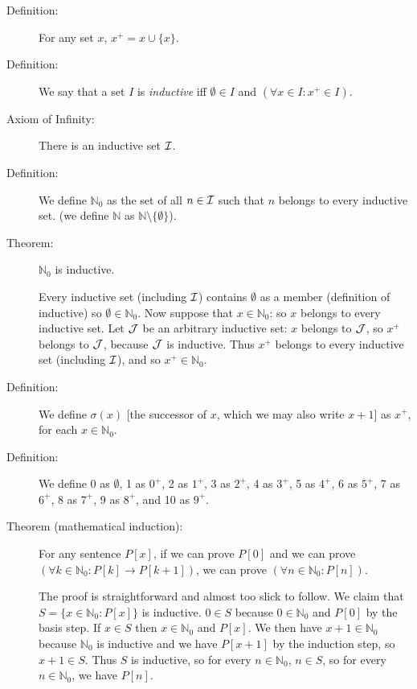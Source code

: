 \documentclass[12pt]{article}
\begin{document}
\begin{description}

\item[Definition:]  For any set $x$, $x^+ = x \cup \{x\}$.

\item[Definition:] We say that a set $I$ is {\em inductive\/} iff $\emptyset \in I$ and $(\forall x \in I:x^+\in I)$.

\item[Axiom of Infinity:]  There is an inductive set $\cal I$.

\item[Definition:]  We define $\mathbb N_0$ as the set of all $n\in \cal I$ such that $n$ belongs to every inductive set.
(we define $\mathbb N$ as $\mathbb N \setminus \{\emptyset\}$).

\item[Theorem:]  $\mathbb N_0$ is inductive.  

Every inductive set (including $\cal I$) contains $\emptyset$ as a member (definition of inductive) so
$\emptyset \in \mathbb N_0$.  Now suppose that $x \in \mathbb N_0$:  so $x$ belongs to every inductive set.  Let $\cal J$ be an arbitrary inductive set:  $x$ belongs to $\cal J$, so $x^+$ belongs to $\cal J$, because $\cal J$ is inductive.  Thus $x^+$ belongs to every inductive set (including $\cal I$), and so $x^+ \in \mathbb N_0$.


\item[Definition:]  We define $\sigma(x)$ [the successor of $x$, which we may also write $x+1$] as $x^+$, for each $x \in \mathbb N_0$.  

\item[Definition:]  We define 0 as $\emptyset$, 1 as $0^+$, 2 as $1^+$, 3 as $2^+$, 4 as $3^+$, 5 as $4^+$, 6 as $5^+$, 7 as $6^+$, 8 as $7^+$, 9 as $8^+$, and 10 as $9^+$.

\item[Theorem (mathematical induction):]  For any sentence $P[x]$, if we can prove $P[0]$ and we can prove $(\forall k\in \mathbb N_0:P[k] \rightarrow P[k+1])$, we can prove $(\forall n \in \mathbb N_0:P[n])$.

The proof is straightforward and almost too slick to follow.  We claim that $S=\{x \in \mathbb N_0:P[x]\}$ is inductive.  $0 \in S$ because $0 \in \mathbb N_0$ and $P[0]$ by the basis step.  If $x \in S$ then $x \in \mathbb N_0$ and $P[x]$.  We then have $x+1 \in \mathbb N_0$ because $\mathbb N_0$ is inductive and we have $P[x+1]$ by the induction step, so $x+1 \in S$.  Thus $S$ is inductive, so for every $n \in \mathbb N_0$, $n \in S$, so for every $n \in \mathbb N_0$, we have $P[n]$.


\end{description}
\end{document}
